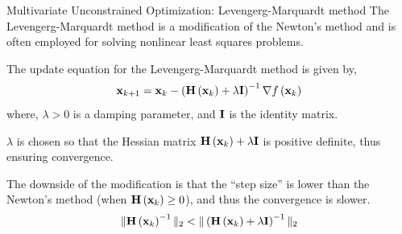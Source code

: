 \documentclass[aspectratio=169]{beamer}
\def\mf{\ensuremath\mathbf}
\def\lp{\ensuremath\left(}
\def\rp{\ensuremath\right)}
\newcommand{\ct}[1]{\lp #1\rp}
\begin{document}
\begin{frame}{Multivariate Unconstrained Optimization: Levengerg-Marquardt method}
  The Levengerg-Marquardt method is a modification of the Newton's method and is often employed for solving nonlinear least squares problems.
  \vspace{0.2cm}
  
  The update equation for the Levengerg-Marquardt method is given by,
  \[ \mf{x}_{k+1} = \mf{x}_{k} - \ct{\mf{H}\ct{\mf{x}_k} + \lambda \mf{I}}^{-1}\nabla f\ct{\mf{x}_k} \]
  where, $\lambda > 0$ is a damping parameter, and $\mf{I}$ is the identity matrix.
  \vspace{0.2cm}
  
  $\lambda$ is chosen so that the Hessian matrix $\mf{H}\ct{\mf{x}_k} + \lambda \mf{I}$ is positive definite, thus ensuring convergence.
  \vspace{0.2cm}
  
  The downside of the modification is that the ``step size'' is lower than the Newton's method (when $\mf{H}\ct{\mf{x}_k} \geq 0$), and thus the convergence is slower.
  \[ \Vert \mf{H}\ct{\mf{x}_k}^{-1} \Vert_2 < \Vert \ct{\mf{H}\ct{\mf{x}_k} + \lambda \mf{I}}^{-1} \Vert_2 \]
\end{frame}
\end{document}
